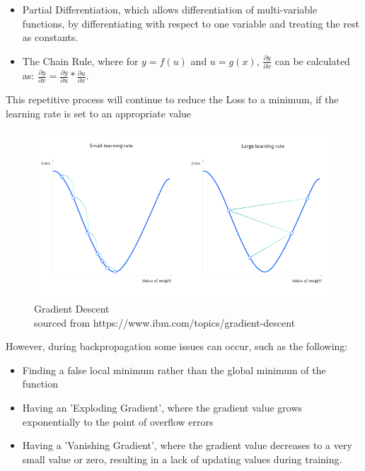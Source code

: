 \documentclass[./project-report/src/latex/project-report.tex]{subfiles}
\begin{document}
\begin{itemize}
    \item Partial Differentiation, which allows differentiation of multi-variable functions, by differentiating with respect to one variable and treating the rest as constants.
    \item The Chain Rule, where for $y = f(u)$ and $u = g(x)$, $\frac{\partial{y}}{\partial{x}}$ can be calculated as: $\frac{\partial{y}}{\partial{x}} = \frac{\partial{y}}{\partial{u}} * \frac{\partial{u}}{\partial{x}}$.
\end{itemize}

This repetitive process will continue to reduce the Loss to a minimum, if the learning rate is set to an appropriate value

\begin{figure}[h!]
\centering
\includegraphics[width=1\textwidth]{./project-report/src/images/gradient-descent.png}
\caption{Gradient Descent\\
        sourced from https://www.ibm.com/topics/gradient-descent}
\end{figure}

\pagebreak

However, during backpropagation some issues can occur, such as the following:

\begin{itemize}
    \item Finding a false local minimum rather than the global minimum of the function
    \item Having an 'Exploding Gradient', where the gradient value grows exponentially to the point of overflow errors
    \item Having a 'Vanishing Gradient', where the gradient value decreases to a very small value or zero, resulting in a lack of updating values during training.
\end{itemize}
\end{document}
